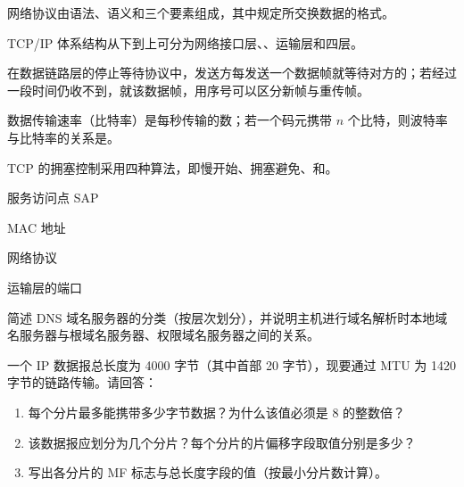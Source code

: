 \documentclass[a4paper,11pt]{article}
\begin{document}

\q 网络协议由语法、语义和\fillblank{}三个要素组成，其中\fillblank{}规定所交换数据的格式。

\q TCP/IP 体系结构从下到上可分为网络接口层、\fillblank{}、运输层和\fillblank{}四层。

\q 在数据链路层的停止等待协议中，发送方每发送一个数据帧就等待对方的\fillblank{}；若经过一段时间仍收不到，就\fillblank{}该数据帧，用序号可以区分新帧与重传帧。

\q 数据传输速率（比特率）是每秒传输的\fillblank{}数；若一个码元携带 \(n\) 个比特，则波特率与比特率的关系是\fillblank{}。

\q TCP 的拥塞控制采用四种算法，即慢开始、拥塞避免、\fillblank{}和\fillblank{}。


\q 服务访问点 SAP\anslines{1.3cm}

\q MAC 地址\anslines{1.3cm}

\q 网络协议\anslines{1.3cm}

\q 运输层的端口\anslines{1.3cm}


\q 简述 DNS 域名服务器的分类（按层次划分），并说明主机进行域名解析时本地域名服务器与根域名服务器、权限域名服务器之间的关系。\anslines{4cm}

\q 一个 IP 数据报总长度为 4000 字节（其中首部 20 字节），现要通过 MTU 为 1420 字节的链路传输。请回答：
\begin{enumerate}[leftmargin=2em, itemsep=2pt, topsep=3pt]
  \item 每个分片最多能携带多少字节数据？为什么该值必须是 8 的整数倍？
  \item 该数据报应划分为几个分片？每个分片的片偏移字段取值分别是多少？
  \item 写出各分片的 MF 标志与总长度字段的值（按最小分片数计算）。
\end{enumerate}
\anslines{6cm}
\end{document}
